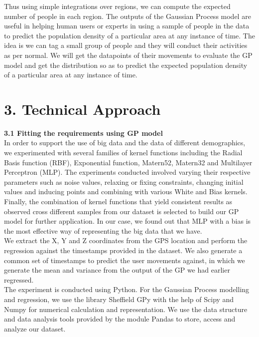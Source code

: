 \documentclass[letterpaper]{article}
\begin{document}
Thus using simple integrations over regions, we can compute the expected number of people in each region. The outputs of the Gaussian Process model are useful in helping human users or experts in using a sample of people in the data to predict the population density of a particular area at any instance of time. The idea is we can tag a small group of people and they will conduct their activities as per normal. We will get the datapoints of their movements to evaluate the GP model and get the distribution so as to predict the expected population density of a particular area at any instance of time. \\

\section{3.  Technical Approach}

{\bf3.1  Fitting the requirements using GP model} \\

In order to support the use of big data and the data of different demographics, we experimented with several families of kernel functions including the Radial Basis function (RBF), Exponential function, Matern52, Matern32 and Multilayer Perceptron (MLP). The experiments conducted involved varying their respective parameters such as noise values, relaxing or fixing constraints, changing initial values and inducing points and combining with various White and Bias kernels. Finally, the combination of kernel functions that yield consistent results as observed cross different samples from our dataset is selected to build our GP model for further application. In our case, we found out that MLP with a bias is the most effective way of representing the big data that we have.\\

We extract the X, Y and Z coordinates from the GPS location and perform the regression against the timestamps provided in the dataset. We also generate a common set of timestamps to predict the user movements against, in which we generate the mean and variance from the output of the GP we had earlier regressed. \\

The experiment is conducted using Python. For the Gaussian Process modelling and regression, we use the library Sheffield GPy with the help of Scipy and Numpy for numerical calculation and representation. We use the data structure and data analysis tools provided by the module Pandas to store, access and analyze our dataset. \\
\end{document}
